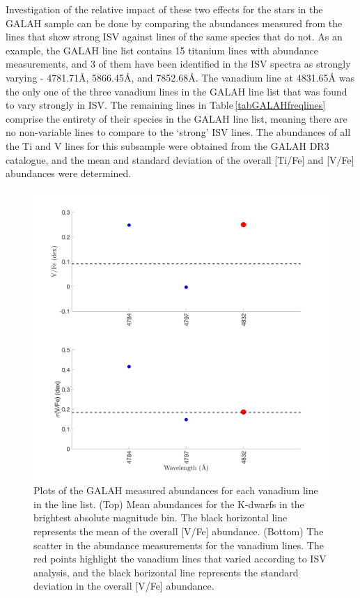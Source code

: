 Investigation of the relative impact of these two effects for the stars in the GALAH sample can be done by comparing the abundances measured from the lines that show strong ISV against lines of the same species that do not. As an example, the GALAH line list contains 15 titanium lines with abundance measurements, and 3 of them have been identified in the ISV spectra as strongly varying - 4781.71\hbox{\AA}, 5866.45\hbox{\AA}, and 7852.68\hbox{\AA}. The vanadium line at 4831.65\hbox{\AA} was the only one of the three vanadium lines in the GALAH line list that was found to vary strongly in ISV. The remaining lines in Table\,\ref{tabGALAHfreqlines} comprise the entirety of their species in the GALAH line list, meaning there are no non-variable lines to compare to the `strong' ISV lines. The abundances of all the Ti and V lines for this subsample were obtained from the GALAH DR3 catalogue, and the mean and standard deviation of the overall [Ti/Fe] and [V/Fe] abundances were determined.\\

\begin{figure}
    \centering
    \includegraphics[width=.8\textwidth]{GALAH_V_abundance.png}
    \caption{Plots of the GALAH measured abundances for each vanadium line in the line list. (Top) Mean abundances for the K-dwarfs in the brightest absolute magnitude bin. The black horizontal line represents the mean of the overall [V/Fe] abundance. (Bottom) The scatter in the abundance measurements for the vanadium lines. The red points highlight the vanadium lines that varied according to ISV analysis, and the black horizontal line represents the standard deviation in the overall [V/Fe] abundance.}
    \label{figGALAHabundance_v}
\end{figure}

